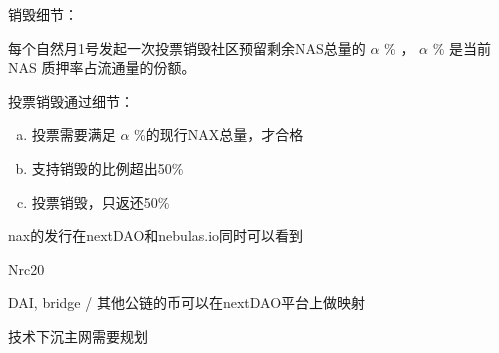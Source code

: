 销毁细节：

每个自然月1号发起一次投票销毁社区预留剩余NAS总量的 \(\alpha\) \% ， \(\alpha\) \% 是当前NAS 质押率占流通量的份额。

投票销毁通过细节：

\begin{enumerate}[a.]
  \item 投票需要满足 \(\alpha\) \%的现行NAX总量，才合格
  \item 支持销毁的比例超出50\%
  \item 投票销毁，只返还50\%
\end{enumerate}

nax的发行在nextDAO和nebulas.io同时可以看到

Nrc20

DAI, bridge / 其他公链的币可以在nextDAO平台上做映射


技术下沉主网需要规划
